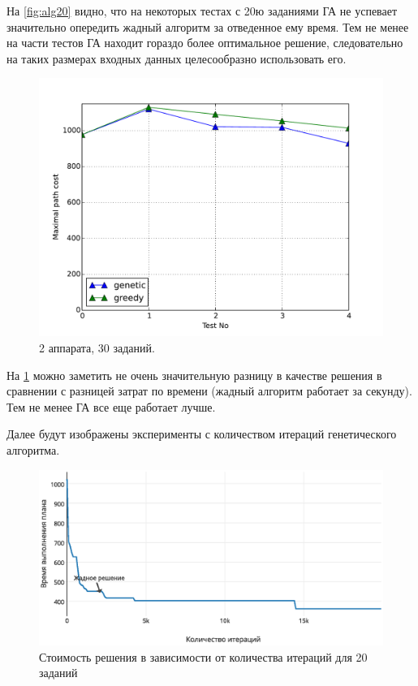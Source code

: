 \documentclass[a4paper,14pt,russian]{article}
\begin{document}
На \cref{fig:alg20} видно, что на некоторых тестах с 20ю заданиями ГА не успевает значительно опередить жадный алгоритм за отведенное ему время. Тем не менее на части тестов ГА находит гораздо более оптимальное решение, следовательно на таких размерах входных данных целесообразно использовать его.

\begin{figure}[here]
\includegraphics[scale=0.8]{images/30figure2.pdf}
\caption{2 аппарата, 30 заданий.}
\label{fig:alg30}
\end{figure}
\pagebreak

На \cref{fig:alg30} можно заметить не очень значительную разницу в качестве решения в сравнении с разницей затрат по времени (жадный алгоритм работает за секунду). Тем не менее ГА все еще работает лучше.

Далее будут изображены эксперименты с количеством итераций генетического алгоритма.

\begin{figure}[here]
\includegraphics[scale=0.8]{images/iter-value-20-plot.eps}
\caption{Стоимость решения в зависимости от количества итераций для 20 заданий}
\label{fig:iter-20}
\end{figure}
\end{document}
